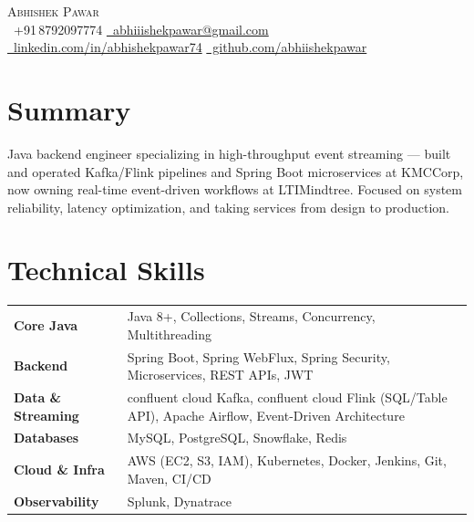 \documentclass[letterpaper,10pt]{article}
\begin{document}
\begin{center}
    {\LARGE \scshape Abhishek Pawar} \\ \vspace{2pt}
    \small
    \faPhone\ +91\,8792097774 \quad
    \href{mailto:abhipawar213@gmail.com}{\faEnvelope\ abhiiishekpawar@gmail.com} \quad
    \href{https://www.linkedin.com/in/abhishekpawar74/}{\faLinkedin\ linkedin.com/in/abhishekpawar74} \quad
    \href{https://github.com/abhiishekpawar}{\faGithub\ github.com/abhiishekpawar}
\end{center}

\vspace{-3pt}

\section{Summary}
\vspace{2pt}
{\small Java backend engineer specializing in high-throughput event streaming — built and operated Kafka/Flink pipelines and Spring Boot microservices at KMCCorp, now owning real-time event-driven workflows at LTIMindtree. Focused on system reliability, latency optimization, and taking services from design to production.}
\vspace{-2pt}

\section{Technical Skills}
\vspace{2pt}
\small
\begin{tabularx}{\textwidth}{@{}>{\bfseries}p{3.1cm} X@{}}
Core Java         & Java 8+, Collections, Streams, Concurrency, Multithreading \\[1pt]
Backend           & Spring Boot, Spring WebFlux, Spring Security, Microservices, REST APIs, JWT \\[1pt]
Data \& Streaming & confluent cloud Kafka, confluent cloud Flink (SQL/Table API), Apache Airflow, Event-Driven Architecture \\[1pt]
Databases         & MySQL, PostgreSQL, Snowflake, Redis \\[1pt]
Cloud \& Infra    & AWS (EC2, S3, IAM), Kubernetes, Docker, Jenkins, Git, Maven, CI/CD \\[1pt]
Observability     & Splunk, Dynatrace \\
\end{tabularx}
\vspace{-2pt}
\end{document}
